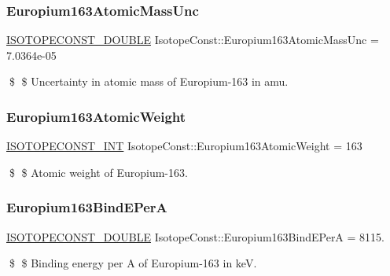 \subsubsection{\texorpdfstring{Europium163\+Atomic\+Mass\+Unc}{Europium163AtomicMassUnc}}
{\footnotesize\ttfamily \mbox{\hyperlink{group___isotope_const-_macros_ga8f45a7272ce02c0b4c65c44636ed719a}{I\+S\+O\+T\+O\+P\+E\+C\+O\+N\+S\+T\+\_\+\+D\+O\+U\+B\+LE}} Isotope\+Const\+::\+Europium163\+Atomic\+Mass\+Unc = 7.\+0364e-\/05}

\$ \$ Uncertainty in atomic mass of Europium-\/163 in amu. \mbox{\label{group___isotope_const-_europium-_eu163_gab5c283fc4a7bb5b4b759fc3492c9827c}} 
\subsubsection{\texorpdfstring{Europium163\+Atomic\+Weight}{Europium163AtomicWeight}}
{\footnotesize\ttfamily \mbox{\hyperlink{group___isotope_const-_macros_ga5f18360b3e99483a35c32d789e62621c}{I\+S\+O\+T\+O\+P\+E\+C\+O\+N\+S\+T\+\_\+\+I\+NT}} Isotope\+Const\+::\+Europium163\+Atomic\+Weight = 163}

\$ \$ Atomic weight of Europium-\/163. \mbox{\label{group___isotope_const-_europium-_eu163_ga3c030d0b8918e973fbfb79d4c073a59b}} 
\subsubsection{\texorpdfstring{Europium163\+Bind\+E\+PerA}{Europium163BindEPerA}}
{\footnotesize\ttfamily \mbox{\hyperlink{group___isotope_const-_macros_ga8f45a7272ce02c0b4c65c44636ed719a}{I\+S\+O\+T\+O\+P\+E\+C\+O\+N\+S\+T\+\_\+\+D\+O\+U\+B\+LE}} Isotope\+Const\+::\+Europium163\+Bind\+E\+PerA = 8115.}

\$ \$ Binding energy per A of Europium-\/163 in keV. \mbox{\label{group___isotope_const-_europium-_eu163_gaec50da35c03f1ad6a3c19ae1e2381cd2}} 
